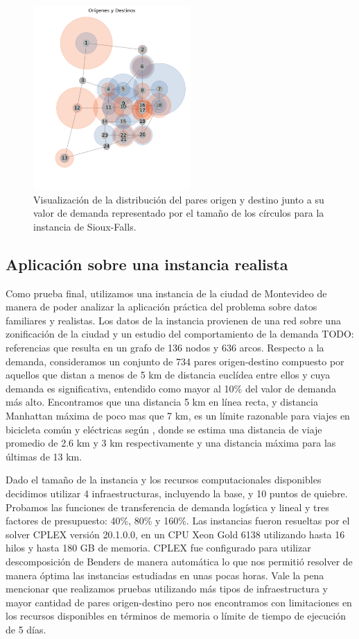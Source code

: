 \documentclass{article}
\begin{document}
  \begin{figure}[h!]
    \centering
    \includegraphics[width=6cm]{../resources/sioux_falls_demand.png}
    \caption{Visualización de la distribución del pares origen y destino junto a su valor de demanda representado por el tamaño de los círculos para la instancia de Sioux-Falls.}
    \label{fig:sioux_falls_demand}
  \end{figure}

  \FloatBarrier
  \subsection{Aplicación sobre una instancia realista}

  Como prueba final, utilizamos una instancia de la ciudad de Montevideo de manera de poder analizar la aplicación práctica del problema sobre datos familiares y realistas. Los datos de la instancia provienen de una red sobre una zonificación de la ciudad y un estudio del comportamiento de la demanda TODO: referencias que resulta en un grafo de 136 nodos y 636 arcos. Respecto a la demanda, consideramos un conjunto de 734 pares origen-destino compuesto por aquellos que distan a menos de 5 km de distancia euclídea entre ellos y cuya demanda es significativa, entendido como mayor al 10\% del valor de demanda más alto. Encontramos que una distancia 5 km en línea recta, y distancia Manhattan máxima de poco mas que 7 km, es un límite razonable para viajes en bicicleta común y eléctricas según \cite{anette2018}, donde se estima una distancia de viaje promedio de 2.6 km y 3 km respectivamente y una distancia máxima para las últimas de 13 km.

  Dado el tamaño de la instancia y los recursos computacionales disponibles decidimos utilizar 4 infraestructuras, incluyendo la base, y 10 puntos de quiebre. Probamos las funciones de transferencia de demanda logística y lineal y tres factores de presupuesto: 40\%, 80\% y 160\%. Las instancias fueron resueltas por el solver CPLEX versión 20.1.0.0, en un CPU Xeon Gold 6138 utilizando hasta 16 hilos y hasta 180 GB de memoria. CPLEX fue configurado para utilizar descomposición de Benders de manera automática lo que nos permitió resolver de manera óptima las instancias estudiadas en unas pocas horas. Vale la pena mencionar que realizamos pruebas utilizando más tipos de infraestructura y mayor cantidad de pares origen-destino pero nos encontramos con limitaciones en los recursos disponibles en términos de memoria o límite de tiempo de ejecución de 5 días.
\end{document}
